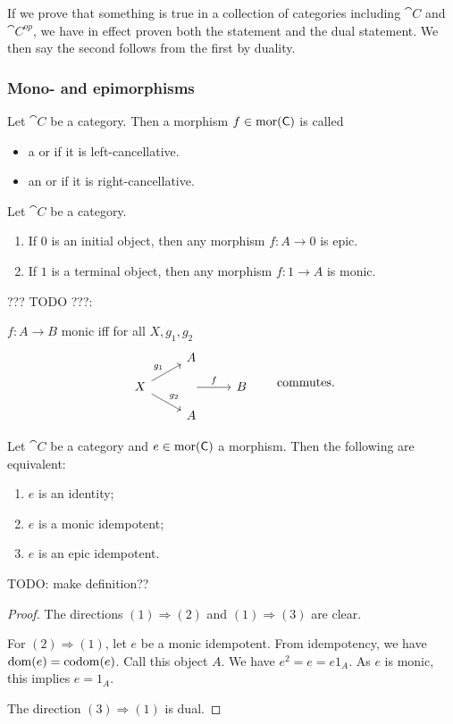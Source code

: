 If we prove that something is true in a collection of categories including $\cat{C}$ and $\cat{C^{op}}$, we have in effect proven both the statement and the dual statement. We then say the second follows from the first by duality.


\subsubsection{Mono- and epimorphisms}
\begin{definition}
Let $\cat{C}$ be a category. Then a morphism $f \in \operatorname{mor}(\mathsf{C})$ is called
\begin{itemize}
\item a  or  if it is left-cancellative.
\item an  or  if it is right-cancellative.
\end{itemize}
\end{definition}

\begin{lemma}
Let $\cat{C}$ be a category.
\begin{enumerate}
\item If $0$ is an initial object, then any morphism $f: A\to 0$ is epic.
\item If $1$ is a terminal object, then any morphism $f: 1\to A$ is monic.
\end{enumerate}
\end{lemma}

??? TODO ???:

$f: A\to B$ monic iff for all $X, g_1, g_2$
\[ \begin{tikzcd}[row sep=small]
& A & \\
X \arrow[ur, "g_1"] \arrow[dr, "g_2"] & \arrow[r, "f"] & B \\
& A  &
\end{tikzcd} \qquad \text{commutes.} \]

\begin{proposition}
Let $\cat{C}$ be a category and $e\in\operatorname{mor}(\mathsf{C})$ a morphism. Then the following are equivalent:
\begin{enumerate}
\item $e$ is an identity;
\item $e$ is a monic idempotent;
\item $e$ is an epic idempotent. 
\end{enumerate}
\end{proposition}
TODO: make definition??
\begin{proof}
The directions $(1) \Rightarrow (2)$ and $(1) \Rightarrow (3)$ are clear.

For $(2)\Rightarrow (1)$, let $e$ be a monic idempotent. From idempotency, we have $\operatorname{dom}(e) = \operatorname{codom}(e)$. Call this object $A$. We have $e^2 = e = e1_A$. As $e$ is monic, this implies $e = 1_A$.

The direction $(3)\Rightarrow (1)$ is dual.
\end{proof}

